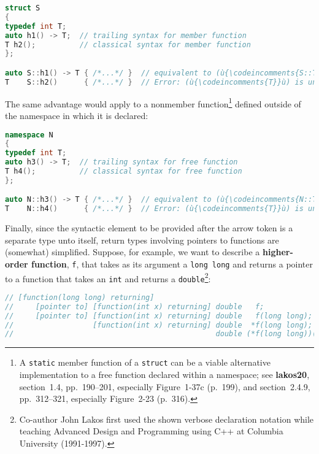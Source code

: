 \begin{lstlisting}[language=C++]
struct S
{
typedef int T;
auto h1() -> T;  // trailing syntax for member function
T h2();          // classical syntax for member function
};

auto S::h1() -> T { /*...*/ }  // equivalent to (ù{\codeincomments{S::T S::h1() \{ /\*...\*/ \}}}ù)
T    S::h2()      { /*...*/ }  // Error: (ù{\codeincomments{T}}ù) is unknown in this context.
\end{lstlisting}

\noindent The same advantage would apply to a nonmember
function{\cprotect\footnote{A \texttt{static} member function of a
\texttt{struct} can be a viable alternative implementation to a free
function declared within a namespace; see \textbf{lakos20}, section~1.4,
pp.~190--201, especially Figure~1-37c (p.~199), and section~2.4.9, pp.~312--321, especially Figure~2-23 (p.~316).}} defined outside of the namespace in
which it is declared:

\begin{lstlisting}[language=C++]
namespace N
{
typedef int T;
auto h3() -> T;  // trailing syntax for free function
T h4();          // classical syntax for free function
};

auto N::h3() -> T { /*...*/ }  // equivalent to (ù{\codeincomments{N::T N::h3() \{ /\*...\*/ \}}}ù)
T    N::h4()      { /*...*/ }  // Error: (ù{\codeincomments{T}}ù) is unknown in this context.
\end{lstlisting}


Finally, since the syntactic element to be provided after the arrow
token is a separate type unto itself, return types involving pointers to
functions are (somewhat) simplified. Suppose, for example, we want to
describe a \textbf{higher-order function}, \texttt{f}, that takes as its
argument a \texttt{long}~\texttt{long} and returns a pointer to a
function that takes an \texttt{int} and returns a
\texttt{double}{\cprotect\footnote{Co-author John Lakos first used the shown verbose declaration notation
while teaching Advanced Design and Programming using C++ at Columbia
University (1991-1997).}}:

\begin{lstlisting}[language=C++]
// [function(long long) returning]
//     [pointer to] [function(int x) returning] double   f;
//     [pointer to] [function(int x) returning] double   f(long long);
//                  [function(int x) returning] double  *f(long long);
//                                              double (*f(long long))(int x);
\end{lstlisting}

